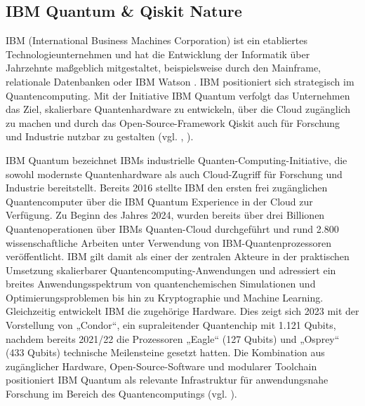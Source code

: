 \subsection*{IBM Quantum \& Qiskit Nature} 
\label{Chemie_Projekte_IBMQiskit}

IBM (International Business Machines Corporation) ist ein etabliertes Technologieunternehmen und hat die Entwicklung der Informatik über Jahrzehnte maßgeblich mitgestaltet, beispielsweise durch den Mainframe, relationale Datenbanken oder IBM Watson \cite{aruteQuantumSupremacyUsing2019a}. IBM positioniert sich strategisch im Quantencomputing. Mit der Initiative IBM Quantum verfolgt das Unternehmen das Ziel, skalierbare Quantenhardware zu entwickeln, über die Cloud zugänglich zu machen und durch das Open-Source-Framework Qiskit auch für Forschung und Industrie nutzbar zu gestalten (vgl. \cite{maksudul_shadat_akash_quantum_2025},  \cite{miceliQuantumComputationVisualization2018}). 

IBM Quantum bezeichnet IBMs industrielle Quanten-Computing-Initiative, die sowohl modernste Quantenhardware als auch Cloud-Zugriff für Forschung und Industrie bereitstellt. Bereits 2016 stellte IBM den ersten frei zugänglichen Quantencomputer über die IBM Quantum Experience in der Cloud zur Verfügung. Zu Beginn des Jahres 2024, wurden bereits über drei Billionen Quantenoperationen über IBMs Quanten-Cloud durchgeführt und rund 2.800 wissenschaftliche Arbeiten unter Verwendung von IBM-Quantenprozessoren veröffentlicht. IBM gilt damit als einer der zentralen Akteure in der praktischen Umsetzung skalierbarer Quantencomputing-Anwendungen und adressiert ein breites Anwendungsspektrum von quantenchemischen Simulationen und Optimierungsproblemen bis hin zu Kryptographie und Machine Learning. Gleichzeitig entwickelt IBM die zugehörige Hardware. Dies zeigt sich 2023 mit der Vorstellung von „Condor“, ein supraleitender Quantenchip mit 1.121 Qubits, nachdem bereits 2021/22 die Prozessoren „Eagle“ (127 Qubits) und „Osprey“ (433 Qubits) technische Meilensteine gesetzt hatten. Die Kombination aus zugänglicher Hardware, Open-Source-Software und modularer Toolchain positioniert IBM Quantum als relevante Infrastruktur für anwendungsnahe Forschung im Bereich des Quantencomputings (vgl. \cite{abughanemIBMQuantumComputers2025}).


